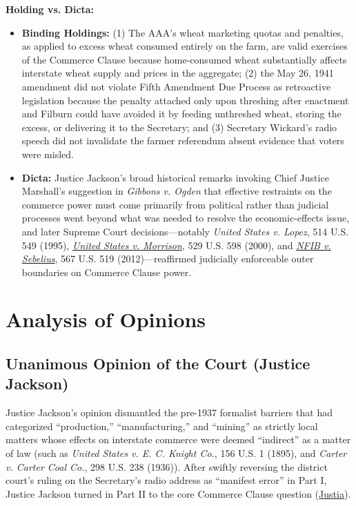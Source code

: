 \documentclass[12pt]{article}
\begin{document}
\textbf{Holding vs. Dicta:}
\begin{itemize}
    \item \textbf{Binding Holdings:} (1) The AAA's wheat marketing quotas and penalties, as applied to excess wheat consumed entirely on the farm, are valid exercises of the Commerce Clause because home-consumed wheat substantially affects interstate wheat supply and prices in the aggregate; (2) the May 26, 1941 amendment did not violate Fifth Amendment Due Process as retroactive legislation because the penalty attached only upon threshing after enactment and Filburn could have avoided it by feeding unthreshed wheat, storing the excess, or delivering it to the Secretary; and (3) Secretary Wickard's radio speech did not invalidate the farmer referendum absent evidence that voters were misled.
    \item \textbf{Dicta:} Justice Jackson's broad historical remarks invoking Chief Justice Marshall's suggestion in \textit{Gibbons v. Ogden} that effective restraints on the commerce power must come primarily from political rather than judicial processes went beyond what was needed to resolve the economic-effects issue, and later Supreme Court decisions---notably \textit{United States v. Lopez}, 514 U.S. 549 (1995), \href{https://supreme.justia.com/cases/federal/us/529/598/}{\textit{United States v. Morrison}}, 529 U.S. 598 (2000), and \href{https://supreme.justia.com/cases/federal/us/567/519/}{\textit{NFIB v. Sebelius}}, 567 U.S. 519 (2012)---reaffirmed judicially enforceable outer boundaries on Commerce Clause power.
\end{itemize}

\section{Analysis of Opinions}

\subsection{Unanimous Opinion of the Court (Justice Jackson)}

Justice Jackson's opinion dismantled the pre-1937 formalist barriers that had categorized ``production,'' ``manufacturing,'' and ``mining'' as strictly local matters whose effects on interstate commerce were deemed ``indirect'' as a matter of law (such as \textit{United States v. E. C. Knight Co.}, 156 U.S. 1 (1895), and \textit{Carter v. Carter Coal Co.}, 298 U.S. 238 (1936)). After swiftly reversing the district court's ruling on the Secretary's radio address as ``manifest error'' in Part I, Justice Jackson turned in Part II to the core Commerce Clause question (\href{https://supreme.justia.com/cases/federal/us/317/111/}{Justia}).
\end{document}

